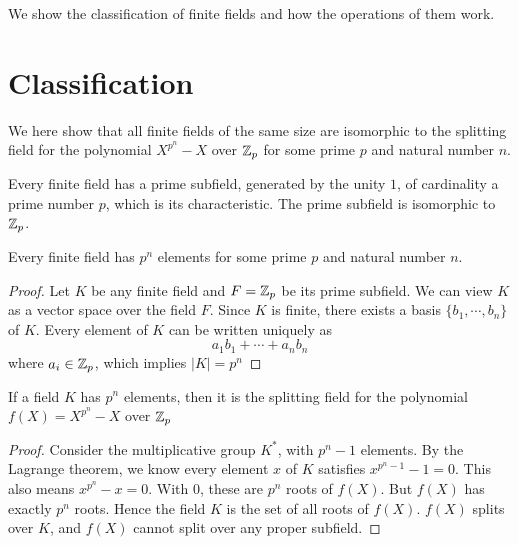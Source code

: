 





\maketitle

We show the classification of finite fields and how the operations of them work.

\section{Classification}

We here show that all finite fields of the same size are isomorphic to the splitting field for the polynomial $X^{p^n} - X$ over $\mathbb{Z}_p$ for some prime $p$ and natural number $n$.

\begin{lemma}
\label{lem-1}
Every finite field has a prime subfield, generated by the unity $1$, of cardinality a prime number $p$, which is its characteristic. The prime subfield is isomorphic to $\mathbb{Z}_p$.

\end{lemma}

\begin{theorem}
\label{thm-1}
Every finite field has $p^n$ elements for some prime $p$ and natural number $n$.
\end{theorem}

\begin{proof}

Let $K$ be any finite field and $F = \mathbb{Z}_p$ be its prime subfield. We can view $K$ as a vector space over the field $F$. Since $K$ is finite, there exists a basis $\{b_1,\cdots,b_n\}$ of $K$. Every element of $K$ can be written uniquely as
\[
	a_1b_1 + \cdots + a_nb_n
\]
where $a_i \in \mathbb{Z}_p$, which implies $|K| = p^n$

\end{proof}

\begin{theorem}
\label{thm-2}
	If a field $K$ has $p^n$ elements, then it is the splitting field for the polynomial $f(X) = X^{p^n} - X$ over $\mathbb{Z}_p$
\end{theorem}

\begin{proof}

Consider the multiplicative group $K^*$, with $p^n - 1$ elements. By the Lagrange theorem, we know every element $x$ of $K$ satisfies $x^{p^n-1} - 1 = 0$. This also means $x^{p^n} - x = 0$. With $0$, these are $p^n$ roots of $f(X)$. But $f(X)$ has exactly $p^n$ roots. Hence the field $K$ is the set of all roots of $f(X)$. $f(X)$ splits over $K$, and $f(X)$ cannot split over any proper subfield.

\end{proof}

